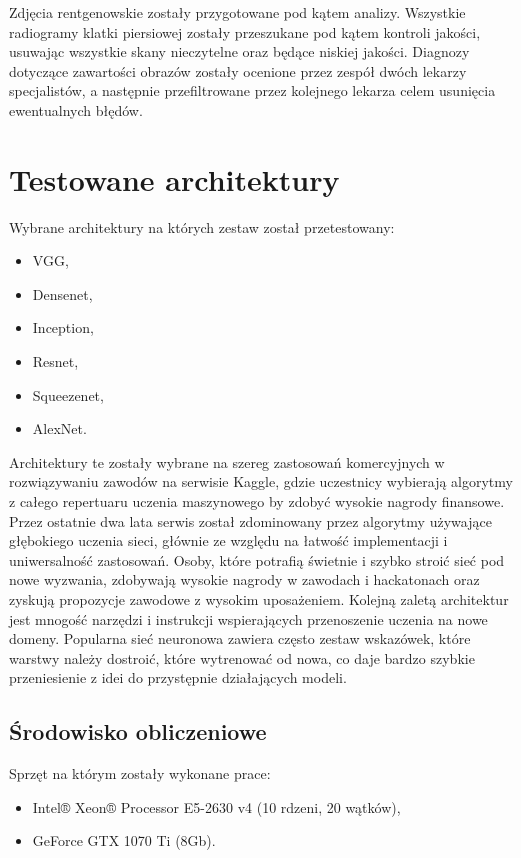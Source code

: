 \documentclass[12pt,a4paper,twoside,titlepage,openright]{book}
\begin{document}
Zdjęcia rentgenowskie zostały przygotowane pod kątem analizy. Wszystkie radiogramy klatki piersiowej zostały przeszukane pod kątem kontroli jakości, usuwając wszystkie skany nieczytelne oraz będące niskiej jakości. Diagnozy dotyczące zawartości obrazów zostały ocenione przez zespół dwóch lekarzy specjalistów, a następnie przefiltrowane przez kolejnego lekarza celem usunięcia ewentualnych błędów.

\section{Testowane architektury}
Wybrane architektury na których zestaw został przetestowany:
\begin{itemize} 
\item VGG,
\item Densenet,
\item Inception,
\item Resnet,
\item Squeezenet,
\item AlexNet.
\end{itemize}

Architektury te zostały wybrane na szereg zastosowań komercyjnych w rozwiązywaniu zawodów na serwisie Kaggle, gdzie uczestnicy wybierają algorytmy z całego repertuaru uczenia maszynowego by zdobyć wysokie nagrody finansowe. Przez ostatnie dwa lata serwis został zdominowany przez algorytmy używające głębokiego uczenia sieci, głównie ze względu na łatwość implementacji i uniwersalność zastosowań. Osoby, które potrafią świetnie i szybko stroić sieć pod nowe wyzwania, zdobywają wysokie nagrody w zawodach i hackatonach oraz zyskują propozycje zawodowe z wysokim uposażeniem. Kolejną zaletą architektur jest mnogość narzędzi i instrukcji wspierających przenoszenie uczenia na nowe domeny. Popularna sieć neuronowa zawiera często zestaw wskazówek, które warstwy należy dostroić, które wytrenować od nowa, co daje bardzo szybkie przeniesienie z idei do przystępnie działających modeli.

\subsection{Środowisko obliczeniowe}
Sprzęt na którym zostały wykonane prace:
\begin{itemize}
\item Intel® Xeon® Processor E5-2630 v4 (10 rdzeni, 20 wątków),
\item GeForce GTX 1070 Ti (8Gb).
\end{itemize}
\end{document}
